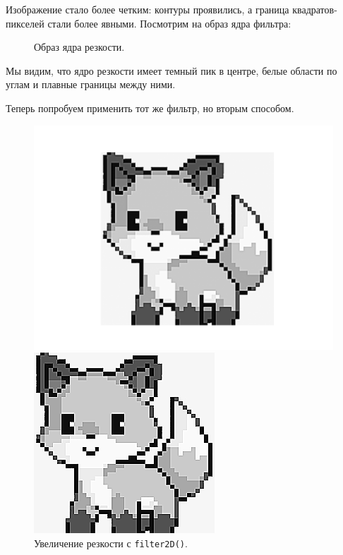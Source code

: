 \documentclass[a4paper]{article}
\begin{document}
\noindent Изображение стало более четким: контуры проявились, а граница квадратов-пикселей стали более явными. Посмотрим на образ ядра фильтра:

\begin{figure}[H]
  \centering
  
  \caption{Образ ядра резкости.}
\end{figure}

\noindent Мы видим, что ядро резкости имеет темный пик в центре, белые области по углам и плавные границы между ними.

Теперь попробуем применить тот же фильтр, но вторым способом.
\begin{figure}[H]
  \centering
  \begin{minipage}{0.49\textwidth}
    \centering
    \includegraphics[width=\textwidth]{src/sharpen.png}
    \caption{Увеличение резкости с \texttt{filter2D()}.}
  \end{minipage}
  \begin{minipage}{0.49\textwidth}
    \centering
    \includegraphics[width=\textwidth]{src/ifft_sharpen.png}

\end{minipage}
\end{figure}
\end{document}
